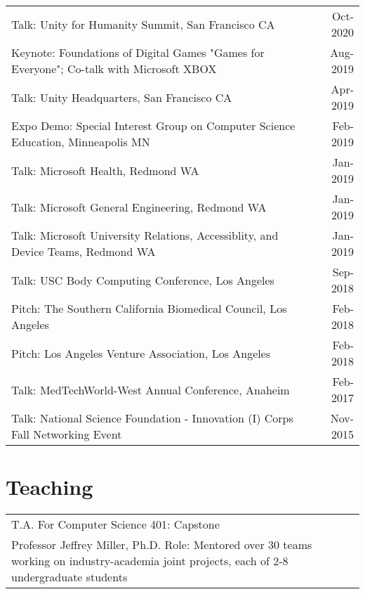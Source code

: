 \documentclass[10pt,a4paper]{article}
\begin{document}
  \vspace*{1mm}\noindent\begin{tabularx}{17cm}{X r}
    Talk: Unity for Humanity Summit, San Francisco CA & Oct-2020\\ %
    Keynote: Foundations of Digital Games "Games for Everyone"; Co-talk with Microsoft XBOX & Aug-2019 \\
    Talk: Unity Headquarters, San Francisco CA & Apr-2019\\
    Expo Demo: Special Interest Group on Computer Science Education, Minneapolis MN & Feb-2019\\ %
    Talk: Microsoft Health, Redmond WA & Jan-2019\\
    Talk: Microsoft General Engineering, Redmond WA & Jan-2019\\
    Talk: Microsoft University Relations, Accessiblity, and Device Teams, Redmond WA & Jan-2019\\
    Talk: USC Body Computing Conference, Los Angeles & Sep-2018\\ %
    Pitch: The Southern California Biomedical Council, Los Angeles & Feb-2018 \\ %
    Pitch: Los Angeles Venture Association, Los Angeles & Feb-2018 \\%
    Talk: MedTechWorld-West Annual Conference, Anaheim & Feb-2017\\ %
    Talk: National Science Foundation - Innovation (I) Corps Fall Networking Event & Nov-2015\\
  \end{tabularx}

\vspace*{2mm}\section*{Teaching}

  \vspace*{1mm}\noindent\begin{tabularx}{17cm}{X r}
    T.A. For Computer Science 401: Capstone & \multirow{3}{*}{}{Spring-2018} \\
    Professor Jeffrey Miller, Ph.D.
    Role: Mentored over 30 teams working on industry-academia joint projects, each of 2-8 undergraduate students\\[2mm]
\end{tabularx}
\end{document}
